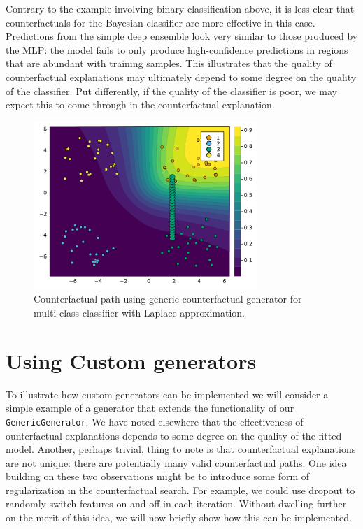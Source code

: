 \documentclass{juliacon}
\begin{document}
Contrary to the example involving binary classification above, it is
less clear that counterfactuals for the Bayesian classifier are more
effective in this case. Predictions from the simple deep ensemble look
very similar to those produced by the MLP: the model fails to only
produce high-confidence predictions in regions that are abundant with
training samples. This illustrates that the quality of counterfactual
explanations may ultimately depend to some degree on the quality of the
classifier. Put differently, if the quality of the classifier is poor,
we may expect this to come through in the counterfactual explanation.

\begin{figure}

{\centering \includegraphics[width=3.33333in,height=2.5in]{www/ce_multi_ensemble.png}

}

\caption{\label{fig-multi-ensemble}Counterfactual path using generic
counterfactual generator for multi-class classifier with Laplace
approximation.}

\end{figure}

\hypertarget{using-custom-generators}{%
\section{Using Custom generators}\label{using-custom-generators}}

To illustrate how custom generators can be implemented we will consider
a simple example of a generator that extends the functionality of our
\texttt{GenericGenerator}. We have noted elsewhere that the
effectiveness of ounterfactual explanations depends to some degree on
the quality of the fitted model. Another, perhaps trivial, thing to note
is that counterfactual explanations are not unique: there are
potentially many valid counterfactual paths. One idea building on these
two observations might be to introduce some form of regularization in
the counterfactual search. For example, we could use dropout to randomly
switch features on and off in each iteration. Without dwelling further
on the merit of this idea, we will now briefly show how this can be
implemented.
\end{document}
